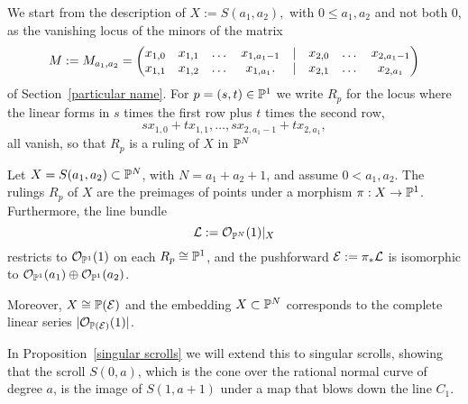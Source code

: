 We start from the description of 
$
X:=S(a_{1}, a_{2}),
$
with $0\leq a_{1}, a_{2}$ and not both 0,
as the vanishing locus of the minors of the matrix
$$
\setcounter{MaxMatrixCols}{20}
M:= M_{a_{1}, a_{2}} = 
\begin{pmatrix}
x_{1,0}&x_{1,1}&\dots&x_{1, a_{1}-1}&|&x_{2,0}&\dots&x_{2, a_{1}-1}\\
x_{1,1}&x_{1,2}&\dots&x_{1, a_{1}}.  &|&x_{2,1}&\dots&x_{2, a_{1}}
\end{pmatrix}
$$
of Section~\ref{particular name}. For $p = (s,t) \in {\mathbb P}^{1}$ we write
$R_{p}$ for the locus where the linear forms in $s$ times the first row plus $t$ times the second row, 
$$
sx_{1,0}+tx_{1,1}, \dots, sx_{2, a_{1}-1}+ tx_{2, a_{1}},
$$
all vanish, so that $R_{p}$ is a ruling of $X$ in ${\mathbb P}^{N}$


\begin{theorem}\label{scroll as proj}
Let $X = S(a_{1}, a_{2})\subset {\mathbb P}^{N}$, with $N = a_{1}+a_{2}+1$, and assume $0<a_{1}, a_{2}$. The rulings $R_{p}$ of $X$ are the preimages of points under a morphism $\pi: X\to {\mathbb P}^{1}$. Furthermore, the line bundle 
$$
{\mathcal L} := {\mathcal O}_{{\mathbb P}^{N}}(1)|_{X}
$$ 
restricts to ${\mathcal O}_{{\mathbb P}^{1}}(1)$ on each $R_{p} \cong {\mathbb P}^{1}$, and the pushforward
${\mathcal E} := \pi_{*}{\mathcal L}$ is isomorphic to 
${\mathcal O}_{{\mathbb P}^{1}}(a_{1})\oplus {\mathcal O}_{{\mathbb P}^{1}}(a_{2})$. 

Moreover, $X\cong {\mathbb P}({\cal E})$ and the embedding $X\subset {\mathbb P}^N$ corresponds to the complete linear series $|{\mathcal O}_{{\mathbb P}({\cal E})}(1)|$.
\end{theorem} 

In Proposition~\ref{singular scrolls} we will extend this to singular scrolls, showing that the scroll $S(0,a)$, which is the cone over the rational normal curve 
of degree $a$, is the image of $S(1,a+1)$ under a map that blows down the line $C_{1}$.

